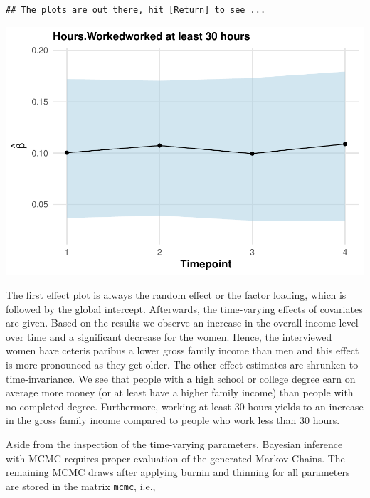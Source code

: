 \documentclass[a4paper, preprint, 3p,
authoryear]{elsarticle} %
\newenvironment{Shaded}{\begin{snugshade}}{\end{snugshade}}
\newcommand{\NormalTok}[1]{#1}
\begin{document}
\begin{verbatim}
## The plots are out there, hit [Return] to see ...
\end{verbatim}

\includegraphics[width=0.7\linewidth]{Vignette-for-panelTVP_files/figure-latex/myplot-5}

The first effect plot is always the random effect or the factor loading,
which is followed by the global intercept. Afterwards, the time-varying
effects of covariates are given. Based on the results we observe an
increase in the overall income level over time and a significant
decrease for the women. Hence, the interviewed women have ceteris
paribus a lower gross family income than men and this effect is more
pronounced as they get older. The other effect estimates are shrunken to
time-invariance. We see that people with a high school or college degree
earn on average more money (or at least have a higher family income)
than people with no completed degree. Furthermore, working at least 30
hours yields to an increase in the gross family income compared to
people who work less than 30 hours.

Aside from the inspection of the time-varying parameters, Bayesian
inference with MCMC requires proper evaluation of the generated Markov
Chains. The remaining MCMC draws after applying burnin and thinning for
all parameters are stored in the matrix \texttt{mcmc}, i.e.,

\begin{Shaded}
\end{Shaded}
\end{document}
